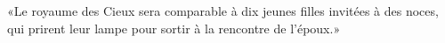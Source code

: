 \encetemps \jesusdisciplesparabole
	«Le royaume des Cieux sera comparable à dix jeunes filles invitées à des noces,
	qui prirent leur lampe pour sortir à la rencontre de l’époux.»
